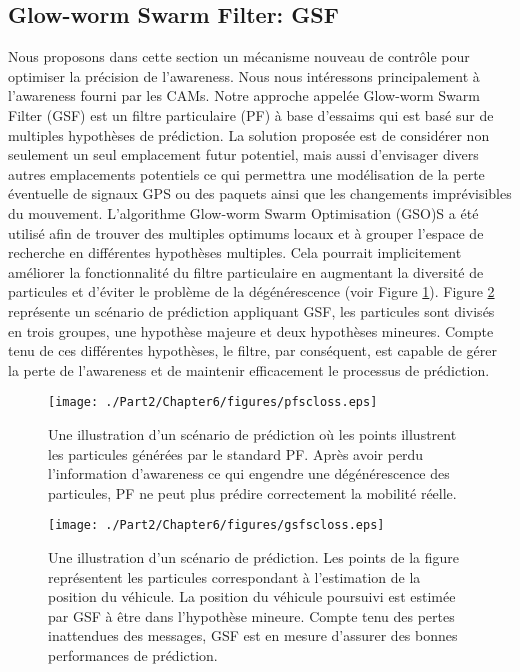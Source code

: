 \subsection{Glow-worm Swarm Filter: GSF}

Nous proposons dans cette section un mécanisme nouveau de contrôle pour optimiser la précision de l'awareness. Nous nous intéressons principalement à l'awareness fourni par les CAMs. Notre approche appelée Glow-worm Swarm Filter (GSF) est un filtre particulaire (PF) à base d'essaims qui est basé sur de multiples hypothèses de prédiction. La solution proposée est de considérer non seulement un seul emplacement futur potentiel, mais aussi d'envisager divers autres emplacements potentiels ce qui permettra une modélisation de la perte éventuelle de signaux GPS ou des paquets ainsi que les changements imprévisibles du mouvement.
L'algorithme Glow-worm Swarm Optimisation (GSO)S a été utilisé afin de trouver des multiples optimums locaux et à grouper l'espace de recherche en différentes hypothèses multiples. Cela pourrait implicitement améliorer la fonctionnalité du filtre particulaire en augmentant la diversité de particules et d'éviter le problème de la dégénérescence (voir Figure \ref{fig:pfscenario}). Figure \ref{fig:gsfscenario} représente un scénario de prédiction appliquant GSF, les particules sont divisés en trois groupes, une hypothèse majeure et deux hypothèses mineures. Compte tenu de ces différentes hypothèses, le filtre, par conséquent, est capable de gérer la perte de l'awareness et de maintenir efficacement le processus de prédiction.

\begin{figure}[!h]
\centering
\texttt{[image: ./Part2/Chapter6/figures/pfscloss.eps]}
\caption[Une illustration d'un scénario de prédiction où les points illustrent les particules générées par le standard PF.] {Une illustration d'un scénario de prédiction où les points illustrent les particules générées par le standard PF. Après avoir perdu l'information d'awareness ce qui engendre une dégénérescence des particules, PF ne peut plus prédire correctement la mobilité réelle.}
\label{fig:pfscenario}
\end{figure}

\begin{figure}[!h]
\centering
\texttt{[image: ./Part2/Chapter6/figures/gsfscloss.eps]}
\caption[Une illustration d'un scénario de prédiction.] {Une illustration d'un scénario de prédiction. Les points de la figure représentent les particules correspondant à l'estimation de la position du véhicule. La position du véhicule poursuivi est estimée par GSF à être dans l'hypothèse mineure. Compte tenu des pertes inattendues des messages, GSF est en mesure d'assurer des bonnes performances de prédiction.}
\label{fig:gsfscenario}
\end{figure}

